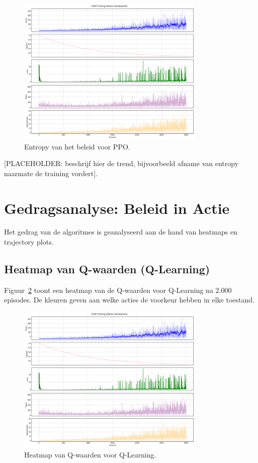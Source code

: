 \documentclass[a4paper,10pt]{report}
\begin{document}
\begin{figure}[ht]
    \centering
    \includegraphics[width=0.8\textwidth]{../Experimenten/Snake/DQN/dqn_analysis.png}
    \caption{Entropy van het beleid voor PPO.}
    \label{fig:entropy}
\end{figure}

[PLACEHOLDER: beschrijf hier de trend, bijvoorbeeld afname van entropy naarmate de training vordert].

\section{Gedragsanalyse: Beleid in Actie}
Het gedrag van de algoritmes is geanalyseerd aan de hand van heatmaps en
trajectory plots.

\subsection{Heatmap van Q-waarden (Q-Learning)}
Figuur~\ref{fig:heatmap} toont een heatmap van de Q-waarden voor Q-Learning na
2.000 episodes. De kleuren geven aan welke acties de voorkeur hebben in elke
toestand.

\begin{figure}[ht]
    \centering
    \includegraphics[width=0.8\textwidth]{../Experimenten/Snake/DQN/dqn_analysis.png}
    \caption{Heatmap van Q-waarden voor Q-Learning.}
    \label{fig:heatmap}
\end{figure}
\end{document}
